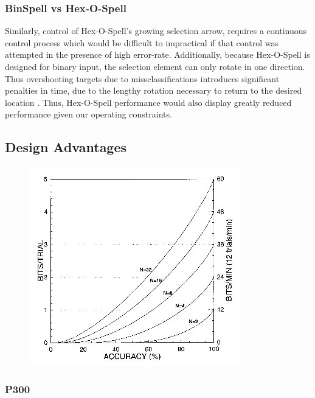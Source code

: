 \documentclass[12pt,titlepage]{article}
\begin{document}
\subsubsection{BinSpell vs Hex-O-Spell}

Similarly, control of Hex-O-Spell's growing selection arrow, requires a continuous control process which would be difficult to impractical if that control was attempted in the presence of high error-rate.  Additionally, 
because Hex-O-Spell is designed for binary input, the selection element 
can only rotate in one direction.  Thus overshooting targets due to missclassifications introduces significant penalties 
in time, due to the lengthy rotation necessary to return to the desired location \cite{blankertz_advanced}.  Thus, Hex-O-Spell performance would also display greatly reduced performance given our operating constraints.

\subsection{Design Advantages}

\begin{figure}[t]
\begin{center}
	\includegraphics[scale=0.75]{fig12.jpg}
	\label{fig:itrvsacc}
\end{center}
\end{figure}

\subsubsection{P300}
\end{document}
